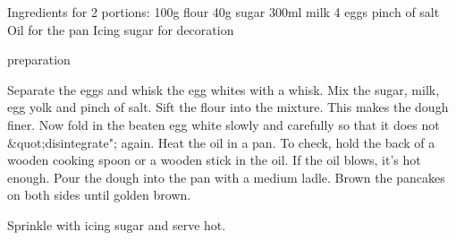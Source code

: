 
Ingredients for 2 portions:
100g flour
40g sugar
300ml milk
4 eggs
pinch of salt
Oil for the pan
Icing sugar for decoration

preparation

Separate the eggs and whisk the egg whites with a whisk.
Mix the sugar, milk, egg yolk and pinch of salt.
Sift the flour into the mixture. This makes the dough finer.
Now fold in the beaten egg white slowly and carefully so that it does not &quot;disintegrate"; again.
Heat the oil in a pan. To check, hold the back of a wooden cooking spoon or a wooden stick in the oil. If the oil blows, it's hot enough.
Pour the dough into the pan with a medium ladle.
Brown the pancakes on both sides until golden brown.

Sprinkle with icing sugar and serve hot.
